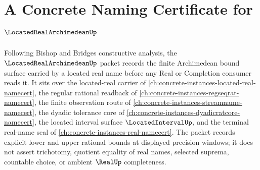 \chapter{A Concrete Naming Certificate for $\LocatedRealArchimedeanUp$}
\label{ch:concrete-instances-located-real-archimedean-namecert}

Following Bishop and Bridges constructive analysis, the $\LocatedRealArchimedeanUp$ packet records the finite Archimedean bound surface carried by a located real name before any Real or Completion consumer reads it. It sits over the located-real carrier of \autoref{ch:concrete-instances-located-real-namecert}, the regular rational readback of \autoref{ch:concrete-instances-regseqrat-namecert}, the finite observation route of \autoref{ch:concrete-instances-streamname-namecert}, the dyadic tolerance core of \autoref{ch:concrete-instances-dyadicratcore-namecert}, the located interval surface $\LocatedIntervalUp$, and the terminal real-name seal of \autoref{ch:concrete-instances-real-namecert}. The packet records explicit lower and upper rational bounds at displayed precision windows; it does not assert trichotomy, quotient equality of real names, selected suprema, countable choice, or ambient $\RealUp$ completeness.


